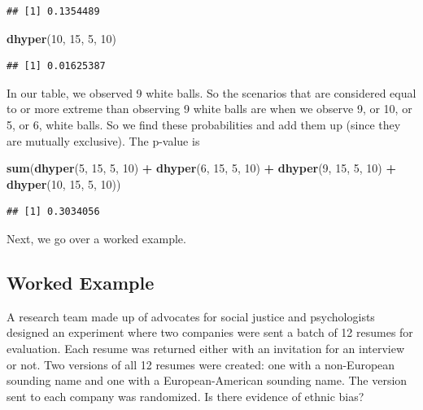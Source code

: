 \documentclass[
]{book}
\newenvironment{Shaded}{\begin{snugshade}}{\end{snugshade}}
\newcommand{\DecValTok}[1]{\textcolor[rgb]{0.00,0.00,0.81}{#1}}
\newcommand{\FunctionTok}[1]{\textcolor[rgb]{0.13,0.29,0.53}{\textbf{#1}}}
\newcommand{\NormalTok}[1]{#1}
\newcommand{\SpecialCharTok}[1]{\textcolor[rgb]{0.81,0.36,0.00}{\textbf{#1}}}
\theoremstyle{definition}
\theoremstyle{definition}
\theoremstyle{definition}
\theoremstyle{definition}
\theoremstyle{remark}
\begin{document}
\begin{verbatim}
## [1] 0.1354489
\end{verbatim}

\begin{Shaded}
\begin{Highlighting}[]
\FunctionTok{dhyper}\NormalTok{(}\DecValTok{10}\NormalTok{, }\DecValTok{15}\NormalTok{, }\DecValTok{5}\NormalTok{, }\DecValTok{10}\NormalTok{)}
\end{Highlighting}
\end{Shaded}

\begin{verbatim}
## [1] 0.01625387
\end{verbatim}

In our table, we observed 9 white balls. So the scenarios that are considered equal to or more extreme than observing 9 white balls are when we observe 9, or 10, or 5, or 6, white balls. So we find these probabilities and add them up (since they are mutually exclusive). The p-value is

\begin{Shaded}
\begin{Highlighting}[]
\FunctionTok{sum}\NormalTok{(}\FunctionTok{dhyper}\NormalTok{(}\DecValTok{5}\NormalTok{, }\DecValTok{15}\NormalTok{, }\DecValTok{5}\NormalTok{, }\DecValTok{10}\NormalTok{) }\SpecialCharTok{+} \FunctionTok{dhyper}\NormalTok{(}\DecValTok{6}\NormalTok{, }\DecValTok{15}\NormalTok{, }\DecValTok{5}\NormalTok{, }\DecValTok{10}\NormalTok{)}
    \SpecialCharTok{+} \FunctionTok{dhyper}\NormalTok{(}\DecValTok{9}\NormalTok{, }\DecValTok{15}\NormalTok{, }\DecValTok{5}\NormalTok{, }\DecValTok{10}\NormalTok{) }\SpecialCharTok{+} \FunctionTok{dhyper}\NormalTok{(}\DecValTok{10}\NormalTok{, }\DecValTok{15}\NormalTok{, }\DecValTok{5}\NormalTok{, }\DecValTok{10}\NormalTok{))}
\end{Highlighting}
\end{Shaded}

\begin{verbatim}
## [1] 0.3034056
\end{verbatim}

Next, we go over a worked example.

\hypertarget{worked-example-11}{%
\subsection{Worked Example}\label{worked-example-11}}

A research team made up of advocates for social justice and psychologists designed an experiment where two companies were sent a batch of 12 resumes for evaluation. Each resume was returned either with an invitation for an interview or not. Two versions of all 12 resumes were created: one with a non-European sounding name and one with a European-American sounding name. The version sent to each company was randomized. Is there evidence of ethnic bias?
\end{document}

